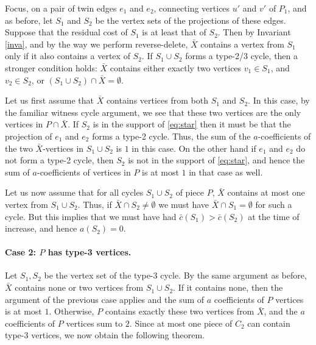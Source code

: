 \documentclass{article}
\newcommand{\0}{\mathbb{0}}
\newcommand{\1}{\mathbb{1}}
\begin{document}
Focus, on a pair of twin edges $e_1$ and $e_2$, connecting vertices $u'$ and
$v'$ of $P_1$, and as before, let $S_1$ and $S_2$ be the vertex sets of the
projections of these edges.  Suppose that the residual cost of $S_1$ is at
least that of $S_2$. Then by Invariant \ref{inva}, and by the way we perform
reverse-delete, $\bar{X}$ contains a vertex from $S_1$
only if it also contains a vertex of $S_2$. If $S_1 \cup S_2$ forms a type-2/3 cycle, then
a stronger condition holds: $\bar{X}$ contains either exactly two vertices $v_1 \in S_1$,
and $v_2 \in S_2$, or $(S_1 \cup S_2)\cap \bar{X}=\emptyset$. 

Let us first assume that $\bar{X}$ contains
vertices from both $S_1$ and $S_2$. In this case, by the familiar witness cycle
argument, we see that these two vertices are the only vertices in $P \cap
\bar{X}$. If $S_2$ is in the support of \eqref{eq:star} then it must be that
the projection of $e_1$ and $e_2$ forms a type-2 cycle. Thus, the sum of the
$a$-coefficients of the two $\bar{X}$-vertices in $S_1 \cup S_2$ is $1$ in
this case. On the other hand if $e_1$ and $e_2$ do not form a type-2 cycle,
then $S_2$ is not in the support of \eqref{eq:star}, and hence the sum of
$a$-coefficients of vertices in $P$ is at most $1$ in that case as well. 

Let us now assume that for all cycles $S_1 \cup S_2$ of piece $P$, $\bar{X}$
contains at most one vertex from $S_1 \cup S_2$. Thus, if $\bar{X} \cap S_2
\neq \emptyset$ we must have $\bar{X}\cap S_1=\emptyset$ for such a cycle. But
this implies that we must have had $\bar{c} (S_1)>\bar{c}(S_2)$ at the time of
increase, and hence $a(S_2)=0$. 

\paragraph{Case 2: $P$ has type-3 vertices.}

Let $S_1,S_2$ be the vertex set of the type-3 cycle. By the same argument as before, 
$\bar{X}$ contains none or two vertices from $S_1 \cup S_2$. If it contains none, then the
argument of the previous case applies and the sum of $a$ coefficients of $P$ vertices is
at most $1$. Otherwise, $P$ contains exactly these two vertices from $\bar{X}$, and the
$a$ coefficients of $P$ vertices sum to $2$. Since at most one piece of $C_2$ can contain
type-3 vertices, we now obtain the following theorem. 
\end{document}
